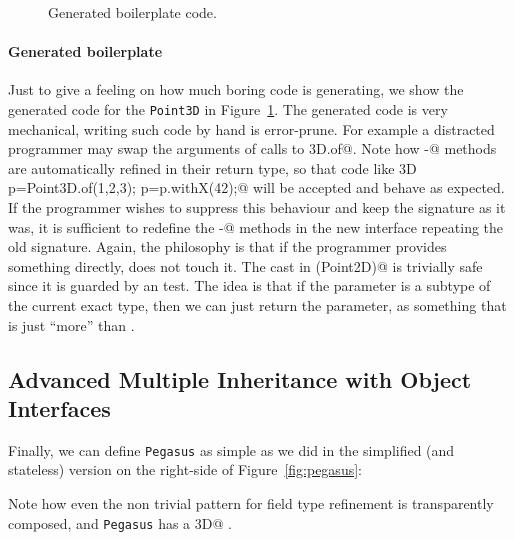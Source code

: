 \begin{figure}
\caption{Generated boilerplate code.}
\label{fig:boilerplate}
\end{figure}

\paragraph{Generated boilerplate}
Just to give a feeling on how much boring code \mixin is generating, we show the
generated code for the \texttt{Point3D} in Figure~\ref{fig:boilerplate}. The
generated code is very mechanical, writing such code by hand is error-prune. For
example a distracted programmer may swap the arguments of calls to
\Q@Point3D.of@.  Note how \Q@with-@ methods are automatically refined in their
return type, so that code like \Q@Point3D p=Point3D.of(1,2,3); p=p.withX(42);@
will be accepted and behave as expected. If the programmer wishes to suppress
this behaviour and keep the signature as it was, it is sufficient to redefine
the \Q@with-@ methods in the new interface repeating the old signature.  Again,
the philosophy is that if the programmer provides something directly, \mixin
does not touch it.  The cast in \Q@with(Point2D)@ is trivially safe since it is
guarded by an \Q@instanceof@ test. The idea is that if the parameter is a
subtype of the current exact type, then we can just return the parameter, as
something that is just ``more'' than \Q@this@.

\subsection{Advanced Multiple Inheritance with Object Interfaces}
Finally, we can define \texttt{Pegasus} as simple as we did in the simplified
(and stateless) version on the right-side of Figure~\ref{fig:pegasus}:


\noindent Note how even the non trivial pattern for field type refinement is
transparently composed, and \texttt{Pegasus} has a \Q@Point3D@
\Q@location@.%

